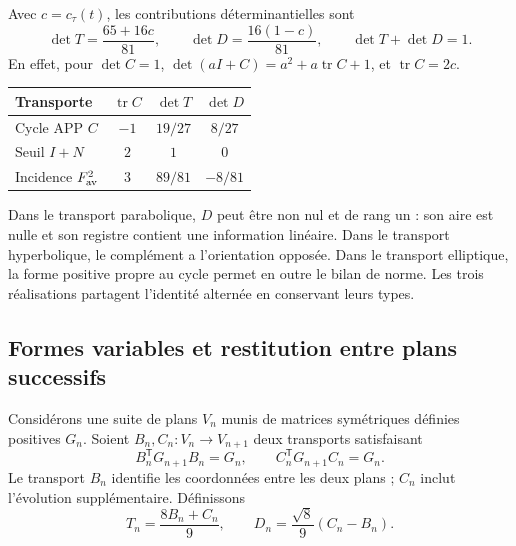 Avec \(c=c_\tau(t)\), les contributions déterminantielles sont
\begin{equation}
 \det T=\frac{65+16c}{81},\qquad
 \det D=\frac{16(1-c)}{81},\qquad
 \det T+\det D=1.
\label{eul:eq:determinantes}
\end{equation}
En effet, pour \(\det C=1\), \(\det(aI+C)=a^2+a\operatorname{tr}C+1\), et \(\operatorname{tr}C=2c\).

\begin{tablacompleta}
\caption{Contributions à l'aire orientée de trois transports engendrés.}
\begin{tabular}{lccc}
\toprule
Transporte&\(\operatorname{tr}C\)&\(\det T\)&\(\det D\)\\
\midrule Cycle APP \(C\)&$-1$&$19/27$&$8/27$\\
Seuil \(I+N\)&$2$&$1$&$0$\\
Incidence \(F_{\rm av}^2\)&$3$&$89/81$&$-8/81$\\
\bottomrule
\end{tabular}
\end{tablacompleta}

Dans le transport parabolique, \(D\) peut être non nul et de rang un : son aire est nulle et son registre contient une information linéaire. Dans le transport hyperbolique, le complément a l'orientation opposée. Dans le transport elliptique, la forme positive propre au cycle permet en outre le bilan de norme. Les trois réalisations partagent l'identité alternée en conservant leurs types.

\subsection{Formes variables et restitution entre plans successifs}
\label{eul:formas-variables}

Considérons une suite de plans \(V_n\) munis de matrices symétriques définies positives \(G_n\). Soient \(B_n,C_n:V_n\to V_{n+1}\) deux transports satisfaisant
\[
 B_n^\mathsf TG_{n+1}B_n=G_n,
 \qquad C_n^\mathsf TG_{n+1}C_n=G_n.
\]
Le transport \(B_n\) identifie les coordonnées entre les deux plans ; \(C_n\) inclut l'évolution supplémentaire. Définissons
\[
 T_n=\frac{8B_n+C_n}{9},\qquad
 D_n=\frac{\sqrt8}{9}(C_n-B_n).
\]

